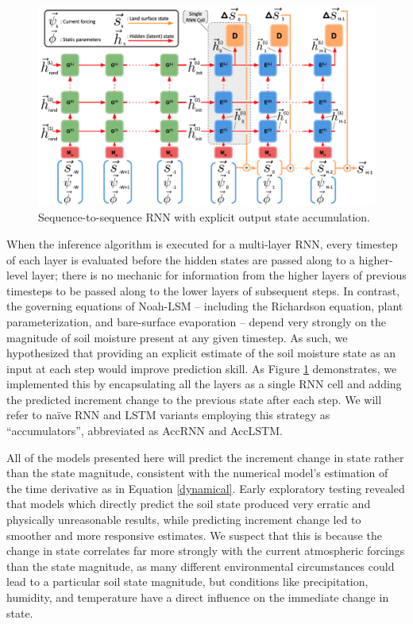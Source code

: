 \begin{figure}[h!]
    \centering
    \includegraphics[width=.95\linewidth]{figures/schematic_s2s-accumulator-embed.png}

    \caption{Sequence-to-sequence RNN with explicit output state accumulation.}
    \label{s2s-accumulator}
\end{figure}

When the inference algorithm is executed for a multi-layer RNN, every timestep of each layer is evaluated before the hidden states are passed along to a higher-level layer; there is no mechanic for information from the higher layers of previous timesteps to be passed along to the lower layers of subsequent steps. In contrast, the governing equations of Noah-LSM -- including the Richardson equation, plant parameterization, and bare-surface evaporation -- depend very strongly on the magnitude of soil moisture present at any given timestep. As such, we hypothesized that providing an explicit estimate of the soil moisture state as an input at each step would improve prediction skill. As Figure \ref{s2s-accumulator} demonstrates, we implemented this by encapsulating all the layers as a single RNN cell and adding the predicted increment change to the previous state after each step. We will refer to na\"ive RNN and LSTM variants employing this strategy as ``accumulators'', abbreviated as AccRNN and AccLSTM.

All of the models presented here will predict the increment change in state rather than the state magnitude, consistent with the numerical model's estimation of the time derivative as in Equation \ref{dynamical}. Early exploratory testing revealed that models which directly predict the soil state produced very erratic and physically unreasonable results, while predicting increment change led to smoother and more responsive estimates. We suspect that this is because the change in state correlates far more strongly with the current atmospheric forcings than the state magnitude, as many different environmental circumstances could lead to a particular soil state magnitude, but conditions like precipitation, humidity, and temperature have a direct influence on the immediate change in state.

